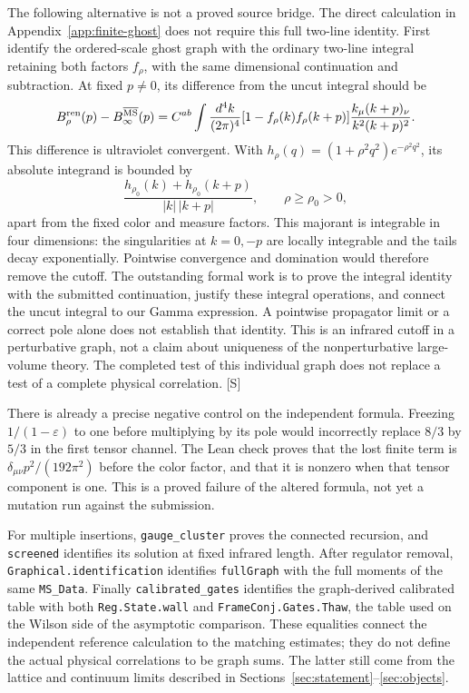 \documentclass[11pt]{article}
\newcommand{\MS}{\overline{\mathrm{MS}}}
\newcommand{\code}[1]{{\small\nolinkurl{#1}}}
\newcommand{\src}[1]{\textsf{[#1]}}
\begin{document}
The following alternative is not a proved source bridge.
The direct calculation in Appendix~\ref{app:finite-ghost} does not
require this full two-line identity. First identify the ordered-scale ghost graph with the ordinary
two-line integral retaining both factors $f_\rho$, with the same
dimensional continuation and subtraction. At fixed $p\ne0$, its
difference from the uncut integral should be
\begin{equation}\label{eq:ghost-cutoff-difference}
 B_\rho^{\rm ren}(p)-B_\infty^{\MS}(p)
 = C^{ab}\int\frac{d^4k}{(2\pi)^4}
   [1-f_\rho(k)f_\rho(k+p)]
       \frac{k_\mu(k+p)_\nu}{k^2(k+p)^2}.
\end{equation}
This difference is ultraviolet convergent. With
$h_\rho(q)=(1+\rho^2q^2)e^{-\rho^2q^2}$, its absolute integrand is
bounded by
\[
 \frac{h_{\rho_0}(k)+h_{\rho_0}(k+p)}{|k|\,|k+p|},
 \qquad \rho\ge\rho_0>0,
\]
apart from the fixed color and measure factors. This majorant is
integrable in four dimensions: the singularities at $k=0,-p$ are
locally integrable and the tails decay exponentially. Pointwise
convergence and domination would therefore remove the cutoff.
The outstanding formal work is to prove the integral identity with
the submitted continuation, justify these integral operations, and
connect the uncut integral to our Gamma expression. A pointwise
propagator limit or a correct pole alone does not establish that identity.
This is an infrared cutoff in a perturbative graph, not a claim about
uniqueness of the nonperturbative large-volume theory. The completed
test of this individual graph does not replace a test of a complete
physical correlation. \src{S}

There is already a precise negative control on the independent formula.
Freezing $1/(1-\varepsilon)$ to one before multiplying by its pole
would incorrectly replace $8/3$ by $5/3$ in the first tensor channel.
The Lean check proves that the lost finite term is
$\delta_{\mu\nu}p^2/(192\pi^2)$ before the color factor, and that it is
nonzero when that tensor component is one. This is a proved failure of
the altered formula, not yet a mutation run against the submission.

For multiple insertions, \code{gauge_cluster} proves the connected
recursion, and \code{screened} identifies its solution at fixed
infrared length. After regulator removal,
\code{Graphical.identification} identifies \code{fullGraph} with the
full moments of the same \code{MS_Data}. Finally
\code{calibrated_gates} identifies the graph-derived calibrated table
with both \code{Reg.State.wall} and \code{FrameConj.Gates.Thaw}, the
table used on the Wilson side of the asymptotic comparison.
These equalities connect the independent reference calculation to the
matching estimates; they do not define the actual physical correlations
to be graph sums. The latter still come from the lattice and continuum
limits described in Sections~\ref{sec:statement}--\ref{sec:objects}.
\end{document}

